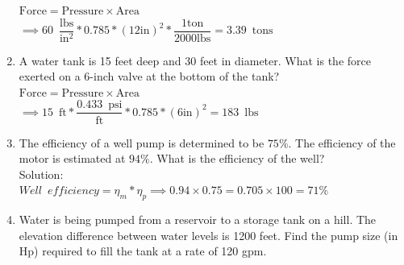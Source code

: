 \documentclass{article}
\begin{document}
\begin{enumerate}
$\textrm{Force}= \textrm{Pressure} \times \textrm{Area}$\\
\vspace{0.3cm}
$\implies 60 \enspace \dfrac{\mathrm{lbs}}{\mathrm{in^2}}*0.785 *(12 \mathrm{in})^2*\dfrac{1 \mathrm{ton}}{2000 \mathrm{lbs}} =\boxed{3.39 \enspace\mathrm{tons}}$
\vspace{0.3cm}

\item A water tank is 15 feet deep and 30 feet in diameter. What is the force exerted on a 6-inch valve at the bottom of the tank?\\
\vspace{0.5cm}
$\textrm{Force}= \textrm{Pressure} \times \textrm{Area}$\\
\vspace{0.5cm}
$\implies 15 \enspace\mathrm{ft}* \dfrac{0.433 \enspace \mathrm{psi}}{\mathrm{ft}}*0.785 *(6 \mathrm{in})^2 =\boxed{183 \enspace\mathrm{lbs}}$\\


\item The efficiency of a well pump is determined to be $75 \%$. The efficiency of the motor is estimated at $94 \%$. What is the efficiency of the well?\\
 \vspace{0.2cm}
Solution:\\ 
 \vspace{0.2cm}
$Well \enspace efficiency=\eta_m * \eta_p \implies 0.94 \times 0.75=0.705 \times 100=\boxed{71 \%}$
 \vspace{0.2cm}

  \item Water is being pumped from a reservoir to a storage tank on a hill. The elevation difference between water levels is 1200 feet. Find the pump size (in Hp) required to fill the tank at a rate of 120 gpm.\\
  \vspace{0.2cm}
\end{enumerate}
\end{document}
